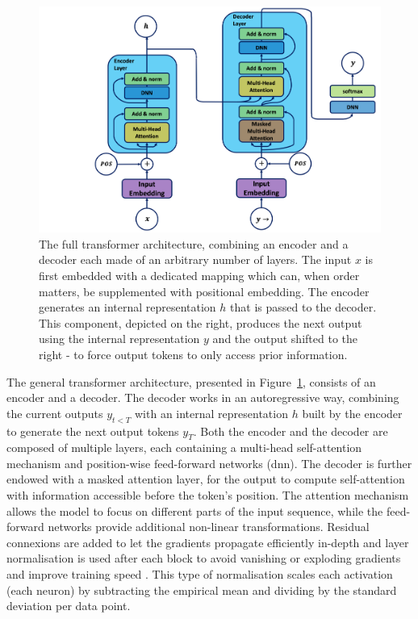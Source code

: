 \begin{figure}[h!]
    \center
    \includegraphics[width=\textwidth]{Images/ML/transformer.png}
    \caption{The full transformer architecture, combining an encoder and a decoder each made of an arbitrary number of layers. The input $x$ is first embedded with a dedicated mapping which can, when order matters, be supplemented with positional embedding. The encoder generates an internal representation $h$ that is passed to the decoder. This component, depicted on the right, produces the next output using the internal representation $y$ and the output shifted to the right - to force output tokens to only access prior information.} 
    \label{fig:tranfoArchi}
\end{figure}

The general transformer architecture, presented in Figure~\ref{fig:tranfoArchi}, consists of an encoder and a decoder. The decoder works in an autoregressive way, combining the current outputs $y_{t<T}$ with an internal representation $h$ built by the encoder to generate the next output tokens $y_{T}$. Both the encoder and the decoder are composed of multiple layers, each containing a multi-head self-attention mechanism and position-wise feed-forward networks (\gls{dnn}). The decoder is further endowed with a masked attention layer, for the output to compute self-attention with information accessible before the token's position. The attention mechanism allows the model to focus on different parts of the input sequence, while the feed-forward networks provide additional non-linear transformations. Residual connexions are added to let the gradients propagate efficiently in-depth and layer normalisation is used after each block to avoid vanishing or exploding gradients and improve training speed \cite{ba2016layer}. This type of normalisation scales each activation (each neuron) by subtracting the empirical mean and dividing by the standard deviation per data point. \\

